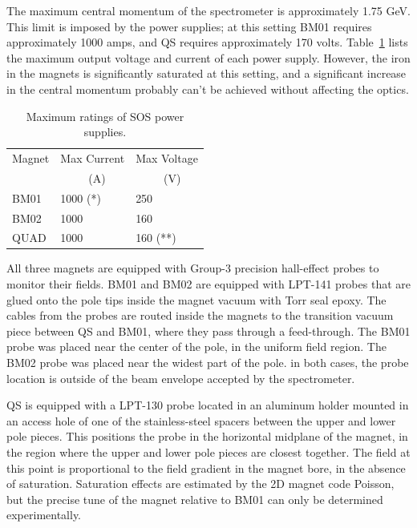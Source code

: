 The maximum central momentum of the spectrometer is approximately 1.75 GeV.
This limit is imposed by the power supplies; at this setting BM01 requires
approximately 1000 amps, and QS requires approximately 170 volts. 
Table~\ref{tab:sos_ratings}
lists the maximum output voltage and current of each power supply. However, the
iron in the magnets is significantly saturated at this setting, and a 
significant
increase in the central momentum probably can't be achieved without affecting
the optics.

\begin{table}
\begin{center}
\caption{Maximum ratings of SOS power supplies. \label{tab:sos_ratings}}
\vspace{\baselineskip}
  \begin{tabular}{lll}
Magnet         &Max Current    &Max Voltage    \\
                     &~~~~~(A)        &~~~~~(V)              \\
\hline
BM01           &1000 (*)       &250            \\
BM02           &1000           &160            \\
QUAD           &1000           &160 (**)       \\
\end{tabular}
\end{center}
\newline
{}

\end{table}

All three magnets are equipped with Group-3 precision hall-effect probes to
monitor their fields. BM01 and BM02 are equipped with LPT-141 probes that are
glued onto the pole tips inside the magnet vacuum with Torr seal epoxy. The cables
from the probes are routed inside the magnets to the transition vacuum piece
between QS and BM01, where they pass through a feed-through. The BM01 probe was
placed near the center of the pole, in the uniform field region. The BM02 probe
was placed near the widest part of the pole. in both cases, the probe location
is outside of the beam envelope accepted by the spectrometer.

QS is equipped with a LPT-130 probe located in an aluminum holder mounted in an
access hole of one of the stainless-steel spacers between the upper and lower
pole pieces. This positions the probe in the horizontal midplane of the magnet,
in the region where the upper and lower pole pieces are closest together. The
field at this point is proportional to the field gradient in the magnet bore, in
the absence of saturation. Saturation effects are estimated by the 2D magnet
code Poisson, but the precise tune of the magnet relative to BM01 can only be
determined experimentally.

